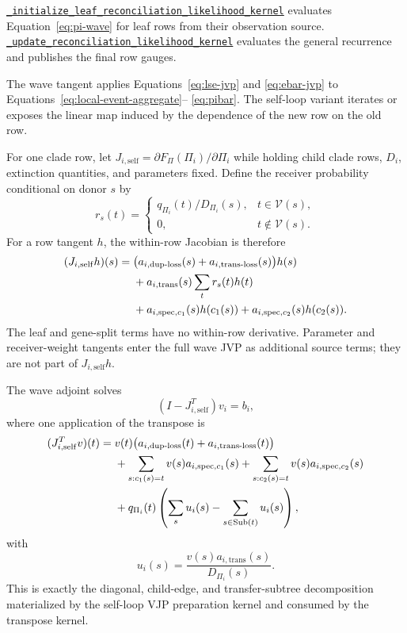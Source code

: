 \documentclass[11pt]{article}
\newcommand{\Sub}{\operatorname{Sub}}
\newcommand{\kernelref}[2]{\href{../../gpurec/core/kernels/#1}{\nolinkurl{#2}}}
\begin{document}
\kernelref{pi_forward.py}{_initialize_leaf_reconciliation_likelihood_kernel} evaluates
Equation~\eqref{eq:pi-wave} for leaf rows from their observation source.
\kernelref{pi_forward.py}{_update_reconciliation_likelihood_kernel}
evaluates the general recurrence and publishes the final row gauges.

The wave tangent applies Equations~\eqref{eq:lse-jvp} and
\eqref{eq:ebar-jvp} to Equations~\eqref{eq:local-event-aggregate}--
\eqref{eq:pibar}.  The self-loop variant iterates or exposes the linear map
induced by the dependence of the new row on the old row.

For one clade row, let
$J_{i,\mathrm{self}}=\partial F_\Pi(\Pi_i)/\partial\Pi_i$ while holding child
clade rows, $D_i$, extinction quantities, and parameters fixed.  Define the
receiver probability conditional on donor $s$ by
\begin{equation}
  r_s(t)=
  \begin{cases}
    q_{\Pi_i}(t)/D_{\Pi_i}(s),&t\in\mathcal V(s),\\
    0,&t\notin\mathcal V(s).
  \end{cases}
  \label{eq:conditional-receiver-probability}
\end{equation}
For a row tangent $h$, the within-row Jacobian is therefore
\begin{align}
  (J_{i,\mathrm{self}}h)(s)
  ={}&\bigl(a_{i,\mathrm{dup\text{-}loss}}(s)
           +a_{i,\mathrm{trans\text{-}loss}}(s)\bigr)h(s) \notag\\
    &+a_{i,\mathrm{trans}}(s)
      \sum_t r_s(t)h(t) \notag\\
    &+a_{i,\mathrm{spec},c_1}(s)h(c_1(s))
     +a_{i,\mathrm{spec},c_2}(s)h(c_2(s)).
  \label{eq:wave-self-jacobian}
\end{align}
The leaf and gene-split terms have no within-row derivative.  Parameter and
receiver-weight tangents enter the full wave JVP as additional source terms;
they are not part of $J_{i,\mathrm{self}}h$.

The wave adjoint solves
\begin{equation}
  (I-J_{i,\mathrm{self}}^T)v_i=b_i,
  \label{eq:wave-adjoint-solve}
\end{equation}
where one application of the transpose is
\begin{align}
  (J_{i,\mathrm{self}}^Tv)(t)
  ={}&v(t)\bigl(a_{i,\mathrm{dup\text{-}loss}}(t)
                    +a_{i,\mathrm{trans\text{-}loss}}(t)\bigr) \notag\\
    &+\sum_{s:c_1(s)=t}v(s)a_{i,\mathrm{spec},c_1}(s)
     +\sum_{s:c_2(s)=t}v(s)a_{i,\mathrm{spec},c_2}(s) \notag\\
    &+q_{\Pi_i}(t)\left(
       \sum_s u_i(s)-\sum_{s\in\Sub(t)}u_i(s)
      \right),
  \label{eq:wave-self-transpose}
\end{align}
with
\begin{equation}
  u_i(s)=\frac{v(s)a_{i,\mathrm{trans}}(s)}{D_{\Pi_i}(s)}.
\end{equation}
This is exactly the diagonal, child-edge, and transfer-subtree decomposition
materialized by the self-loop VJP preparation kernel and consumed by the
transpose kernel.
\end{document}

